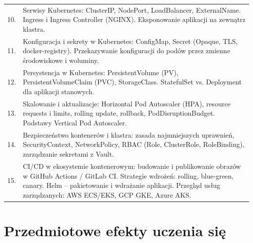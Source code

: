 \documentclass[12pt, a4paper]{article}
\begin{document}
{\begin{longtable}{m{1.5cm}m{14.5cm}}
  \rowcolor{tableRowAlt} 10. & Serwisy Kubernetes: ClusterIP, NodePort, LoadBalancer, ExternalName. Ingress i Ingress Controller (NGINX). Eksponowanie aplikacji na zewnątrz klastra. \\
  \rowcolor{tableRowLight} 11. & Konfiguracja i sekrety w Kubernetes: ConfigMap, Secret (Opaque, TLS, docker-registry). Przekazywanie konfiguracji do podów przez zmienne środowiskowe i woluminy. \\
  \rowcolor{tableRowAlt} 12. & Persystencja w Kubernetes: PersistentVolume (PV), PersistentVolumeClaim (PVC), StorageClass. StatefulSet vs. Deployment dla aplikacji stanowych. \\
  \rowcolor{tableRowLight} 13. & Skalowanie i aktualizacje: Horizontal Pod Autoscaler (HPA), resource requests i limits, rolling update, rollback, PodDisruptionBudget. Podstawy Vertical Pod Autoscaler. \\
  \rowcolor{tableRowAlt} 14. & Bezpieczeństwo kontenerów i klastra: zasada najmniejszych uprawnień, SecurityContext, NetworkPolicy, RBAC (Role, ClusterRole, RoleBinding), zarządzanie sekretami z Vault. \\
  \rowcolor{tableRowLight} 15. & CI/CD w ekosystemie kontenerowym: budowanie i publikowanie obrazów w GitHub Actions / GitLab CI. Strategie wdrożeń: rolling, blue-green, canary. Helm – pakietowanie i wdrażanie aplikacji. Przegląd usług zarządzanych: AWS ECS/EKS, GCP GKE, Azure AKS. \\
\bottomrule
\end{longtable}}

\section{Przedmiotowe efekty uczenia się}
\end{document}
